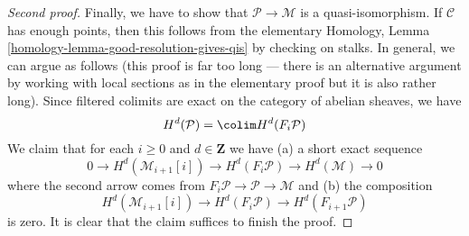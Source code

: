 \begin{proof}[Second proof]
\medskip\noindent
Finally, we have to show that $\mathcal{P} \to \mathcal{M}$
is a quasi-isomorphism. If $\mathcal{C}$ has enough points, then
this follows from the elementary
Homology, Lemma \ref{homology-lemma-good-resolution-gives-qis}
by checking on stalks. In general, we can argue as follows
(this proof is far too long --- there is an alternative argument by
working with local sections as in the elementary proof but it
is also rather long).
Since filtered colimits are exact on the category of abelian
sheaves, we have
$$
H^d(\mathcal{P}) = \colim H^d(F_i\mathcal{P})
$$
We claim that for each $i \geq 0$ and $d \in \mathbf{Z}$
we have (a) a short exact sequence
$$
0 \to H^d(\mathcal{M}_{i + 1}[i]) \to
H^d(F_i\mathcal{P}) \to H^d(\mathcal{M}) \to 0
$$
where the second arrow comes from
$F_i\mathcal{P} \to \mathcal{P} \to \mathcal{M}$
and (b) the composition
$$
H^d(\mathcal{M}_{i + 1}[i]) \to
H^d(F_i\mathcal{P}) \to
H^d(F_{i + 1}\mathcal{P})
$$
is zero. It is clear that the claim suffices to finish the proof.


\end{proof}
